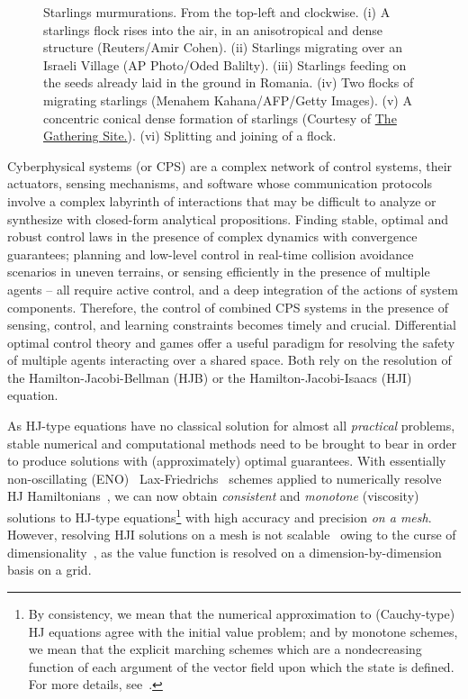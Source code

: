 \begin{figure}[tb!]
\begin{tabular}{ccc}
	\end{tabular}
	\caption{Starlings murmurations. From the top-left and clockwise. (i) A starlings flock rises into the air, in an anisotropical and dense structure (Reuters/Amir Cohen).  (ii) Starlings migrating over an Israeli Village (AP Photo/Oded Balilty). (iii) Starlings feeding on the seeds already laid in the ground in Romania. (iv) Two flocks of migrating starlings (Menahem Kahana/AFP/Getty Images). (v) A concentric conical dense formation of starlings (Courtesy of \href{http://www.thegatheringsite.net/qcgems/2014/1/24/murmuration}{The Gathering Site.}). (vi)  Splitting and joining of a flock.} 
	\label{fig:murmurations}
\end{figure}

\noindent
Cyberphysical systems (or CPS) are  a complex network of control systems, their actuators, sensing mechanisms, and software whose communication protocols involve a complex labyrinth of interactions that may be difficult to analyze or synthesize with closed-form analytical propositions.   Finding stable, optimal and robust control laws in the presence of complex dynamics with convergence guarantees; planning and low-level control in real-time collision avoidance scenarios in uneven terrains, or sensing efficiently in the presence of multiple agents -- all require active control, and a deep integration of the actions of system components. Therefore,  the control of combined CPS systems in the presence of sensing, control, and learning constraints becomes timely and crucial. Differential optimal control theory and games offer a useful paradigm for resolving the safety of multiple agents interacting over a shared space. Both rely on the resolution of the Hamilton-Jacobi-Bellman (HJB) or the Hamilton-Jacobi-Isaacs (HJI) equation.  

As HJ-type equations have no classical solution for almost all \textit{practical} problems, stable numerical and computational methods need to be brought to bear in order to produce solutions with (approximately) optimal guarantees. With essentially non-oscillating (ENO)~\cite{OsherShuENO} Lax-Friedrichs~\cite{CrandallLaxFriedrichs} schemes applied to numerically resolve HJ Hamiltonians~\cite{Evans1984}, we can now obtain  \textit{consistent} and \textit{monotone} (viscosity) solutions to HJ-type equations\footnote{By consistency, we mean that the numerical approximation to (Cauchy-type) HJ equations agree with the initial value problem; and by monotone schemes, we mean that the explicit marching schemes which are a nondecreasing function of each argument of the vector field upon which the state is defined. For more details, see~\cite{Crandall1984Approx}.} with high accuracy and precision \textit{on a mesh}. However, resolving HJI solutions on a mesh is not scalable~\cite{SylviaScalability, Bansal2018, Bajcsy} owing to the curse of dimensionality~\cite{Bellman1957}, as the value function is resolved on a dimension-by-dimension basis on a grid. 

